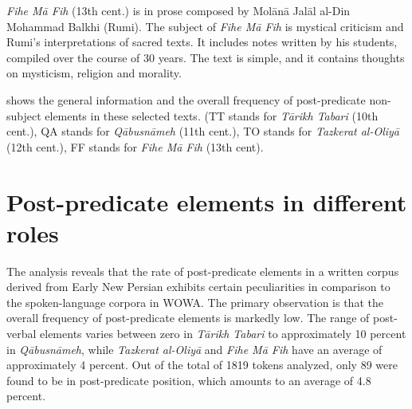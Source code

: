 \documentclass[output=paper,colorlinks,citecolor=brown,draftmode]{langscibook}
\begin{document}
\textit{Fihe Mā Fih} (13th cent.) is in prose composed by Molānā Jalāl al-Din Mohammad Balkhi (Rumi). The subject of \textit{Fihe Mā Fih} is mystical criticism and Rumi's interpretations of sacred texts. It includes notes written by his students, compiled over the course of 30 years. The text is simple, and it contains thoughts on mysticism, religion and morality.

\begin{sloppypar}
 shows the general information and the overall frequency of post-predicate non-subject elements in these selected texts. (TT stands for \textit{Tārikh Tabari} (10th cent.), QA stands for \textit{Qābusnāmeh} (11th cent.), TO stands for \textit{Tazkerat al-Oliyā} (12th cent.), FF stands for \textit{Fihe Mā Fih} (13th cent).
\end{sloppypar}

\begin{table}
 \centering
{}
 \caption{Overview of the Early New Persian text corpus}
 \label{ENP:tab:1}
\end{table}

\section{Post-predicate elements in different roles}\label{ENP:ss:3}

The analysis reveals that the rate of post-predicate elements in a written corpus derived from Early New Persian exhibits certain peculiarities in comparison to the spoken-language corpora in WOWA. The primary observation is that the overall frequency of post-predicate elements is markedly low. The range of post-verbal elements varies between zero in \textit{Tārikh Tabari} to approximately 10 percent in \textit{Qābusnāmeh}, while \textit{Tazkerat al-Oliyā} and \textit{Fihe Mā Fih} have an average of approximately 4 percent. Out of the total of 1819 tokens analyzed, only 89 were found to be in post-predicate position, which amounts to an average of 4.8 percent. 
\end{document}

